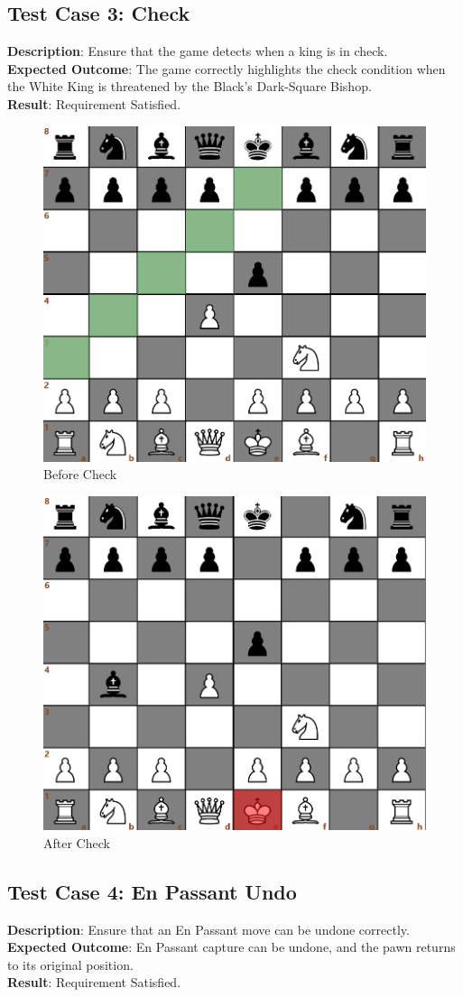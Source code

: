 \documentclass[a4paper,12pt]{article}
\begin{document}
\subsection{Test Case 3: Check}
\textbf{Description}: Ensure that the game detects when a king is in check.\\
\textbf{Expected Outcome}: The game correctly highlights the check condition when the White King is threatened by the Black's Dark-Square Bishop.\\
\textbf{Result}: Requirement Satisfied.

\begin{figure}[H]
    \centering
    \includegraphics[width=0.6\linewidth]{Images/Test Cases/testCase3Img1.png}
    \caption{Before Check}
    \label{fig:BeforeCheck}
\end{figure}

\begin{figure}[H]
    \centering
    \includegraphics[width=0.6\linewidth]{Images/Test Cases/testCase3Img2.png}
    \caption{After Check}
    \label{fig:AfterCheck}
\end{figure}

\subsection{Test Case 4: En Passant Undo}
\textbf{Description}: Ensure that an En Passant move can be undone correctly.\\
\textbf{Expected Outcome}: En Passant capture can be undone, and the pawn returns to its original position.\\
\textbf{Result}: Requirement Satisfied.
\end{document}
